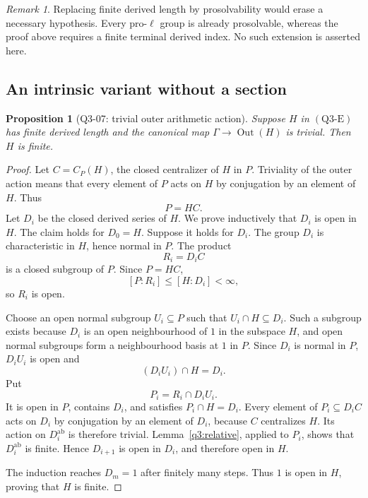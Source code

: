 \documentclass[11pt,a4paper]{article}
\newtheorem{proposition}[theorem]{Proposition}
\theoremstyle{remark}
\newtheorem{remark}[theorem]{Remark}
\begin{document}
\begin{remark}
Replacing finite derived length by prosolvability would erase a
necessary hypothesis.  Every pro-\(\ell\) group is already
prosolvable, whereas the proof above requires a finite terminal
derived index.  No such extension is asserted here.
\end{remark}

\subsection{An intrinsic variant without a section}

\begin{proposition}[Q3-07: trivial outer arithmetic action]
\label{q3:outer}
Suppose \(H\) in \((\mathrm{Q3\text{-}E})\) has finite derived
length and the canonical map
\(\Gamma\to\operatorname{Out}(H)\) is trivial.  Then \(H\) is finite.
\end{proposition}

\begin{proof}
Let \(C=C_P(H)\), the closed centralizer of \(H\) in \(P\).
Triviality of the outer action means that every element of \(P\)
acts on \(H\) by conjugation by an element of \(H\).  Thus
\[
P=HC.
\]
Let \(D_i\) be the closed derived series of \(H\).  We prove
inductively that \(D_i\) is open in \(H\).  The claim holds for
\(D_0=H\).  Suppose it holds for \(D_i\).  The group \(D_i\) is
characteristic in \(H\), hence normal in \(P\).  The product
\[
R_i=D_i C
\]
is a closed subgroup of \(P\).  Since \(P=HC\),
\[
[P:R_i]\le[H:D_i]<\infty,
\]
so \(R_i\) is open.

Choose an open normal subgroup \(U_i\subseteq P\) such that
\(U_i\cap H\subseteq D_i\).  Such a subgroup exists because \(D_i\)
is an open neighbourhood of \(1\) in the subspace \(H\), and open
normal subgroups form a neighbourhood basis at \(1\) in \(P\).
Since \(D_i\) is normal in \(P\), \(D_iU_i\) is open and
\[
(D_iU_i)\cap H=D_i.
\]
Put
\[
P_i=R_i\cap D_iU_i.
\]
It is open in \(P\), contains \(D_i\), and satisfies
\(P_i\cap H=D_i\).  Every element of \(P_i\subseteq D_iC\) acts on
\(D_i\) by conjugation by an element of \(D_i\), because \(C\)
centralizes \(H\).  Its action on \(D_i^{\mathrm{ab}}\) is
therefore trivial.  Lemma~\ref{q3:relative}, applied to \(P_i\),
shows that \(D_i^{\mathrm{ab}}\) is finite.  Hence \(D_{i+1}\)
is open in \(D_i\), and therefore open in \(H\).

The induction reaches \(D_m=1\) after finitely many steps.  Thus
\(1\) is open in \(H\), proving that \(H\) is finite.
\end{proof}
\end{document}

